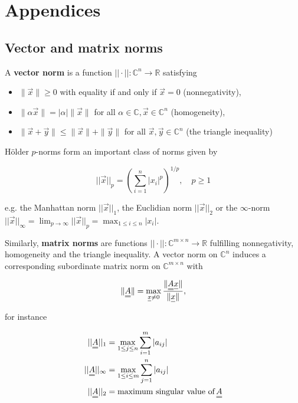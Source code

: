 \appendix
\section{Appendices}
\thispagestyle{plain}

\subsection{Vector and matrix norms}

A \textbf{vector norm} is a function $||\cdot||: \mathbb{C}^n \rightarrow \mathbb{R}$
satisfying

\begin{itemize}
    \item $\|\vec{x}\| \ge 0$ with equality if and only if $\vec{x}=0$ (nonnegativity),
    \item $\|\alpha \vec{x}\| =|\alpha| \|\vec{x}\|$ for all $\alpha\in\mathbb{C}, \vec{x}\in\mathbb{C}^n$ (homogeneity),
    \item $\|\vec{x}+\vec{y}\| \le \|\vec{x}\|+\|\vec{y}\|$ for all $\vec{x},\vec{y}\in\mathbb{C}^n$ (the triangle inequality)
\end{itemize}

Hölder $p$-norms form an important class of norms given by

\begin{equation}
    ||\vec{x}||_p = \left(\sum_{i=1}^{n} |x_i|^p\right)^{1/p}, \quad p \geq 1
\end{equation}

e.g. the Manhattan norm $||\vec{x}||_1$, the Euclidian norm $||\vec{x}||_2$ or the
$\infty$-norm $||\vec{x}||_\infty = \lim_{p \to \infty} ||\vec{x}||_p = \max_{1 \leq i \leq n} |x_i|$.

Similarly, \textbf{matrix norms} are 
functions $||\cdot||: \mathbb{C}^{m\times n} \rightarrow \mathbb{R}$ fulfilling
nonnegativity, homogeneity and the triangle inequality. A vector norm on $\mathbb{C}^n$
induces a corresponding subordinate matrix norm on $\mathbb{C}^{m\times n}$ with

\begin{equation}
    \|\mat{A}\| = \displaystyle\max_{\vec{x}\ne0} \frac{ \|\mat{A}\vec{x}\| }{ \|\vec{x}\| }, 
\end{equation}

for instance

\begin{equation}
    \begin{aligned}
        ||\mat{A}||_1 &= \max_{1 \leq j \leq n} \sum_{i=1}^{m} |a_{ij}| \\
        ||\mat{A}||_\infty &= \max_{1 \leq i \leq m} \sum_{j=1}^{n} |a_{ij}| \\
        ||\mat{A}||_2 &= \text{maximum singular value of} \, \mat{A} \\
    \end{aligned}
\end{equation}


